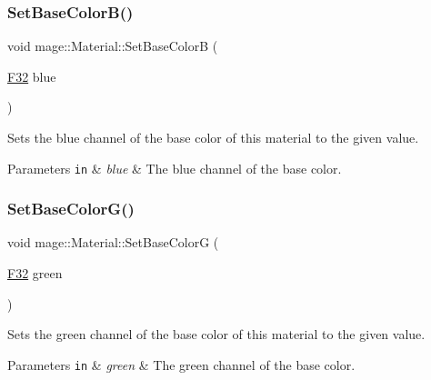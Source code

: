 \subsubsection{\texorpdfstring{Set\+Base\+Color\+B()}{SetBaseColorB()}}
{\footnotesize\ttfamily void mage\+::\+Material\+::\+Set\+Base\+ColorB (\begin{DoxyParamCaption}\item[{\hyperlink{namespacemage_aa97e833b45f06d60a0a9c4fc22ae02c0}{F32}}]{blue }\end{DoxyParamCaption})\hspace{0.3cm}{\ttfamily [noexcept]}}

Sets the blue channel of the base color of this material to the given value.


\begin{DoxyParams}[1]{Parameters}
\mbox{\tt in}  & {\em blue} & The blue channel of the base color. \\
\hline
\end{DoxyParams}
\hypertarget{structmage_1_1_material_a5969ee99b74e884838e991374012dcb3}{}\label{structmage_1_1_material_a5969ee99b74e884838e991374012dcb3} 
\subsubsection{\texorpdfstring{Set\+Base\+Color\+G()}{SetBaseColorG()}}
{\footnotesize\ttfamily void mage\+::\+Material\+::\+Set\+Base\+ColorG (\begin{DoxyParamCaption}\item[{\hyperlink{namespacemage_aa97e833b45f06d60a0a9c4fc22ae02c0}{F32}}]{green }\end{DoxyParamCaption})\hspace{0.3cm}{\ttfamily [noexcept]}}

Sets the green channel of the base color of this material to the given value.


\begin{DoxyParams}[1]{Parameters}
\mbox{\tt in}  & {\em green} & The green channel of the base color. \\
\hline
\end{DoxyParams}
\hypertarget{structmage_1_1_material_ad576d2d4a9530cce224ad5f61cacc4be}{}\label{structmage_1_1_material_ad576d2d4a9530cce224ad5f61cacc4be} 
